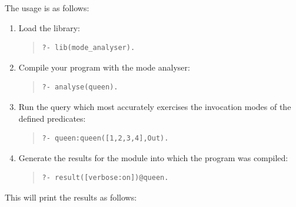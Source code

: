 The usage is as follows:
\begin{enumerate}
\item Load the  library:
\begin{quote}
\begin{verbatim}
?- lib(mode_analyser).
\end{verbatim}
\end{quote}
\item Compile your program with the mode analyser:
\begin{quote}
\begin{verbatim}
?- analyse(queen).
\end{verbatim}
\end{quote}
\item Run the query which most accurately exercises the
invocation modes of the defined predicates:
\begin{quote}
\begin{verbatim}
?- queen:queen([1,2,3,4],Out).
\end{verbatim}
\end{quote}
\item Generate the results for the module into which
the program was compiled:
\begin{quote}
\begin{verbatim}
?- result([verbose:on])@queen.
\end{verbatim}\end{quote}
\end{enumerate}
This will print the results as follows:
